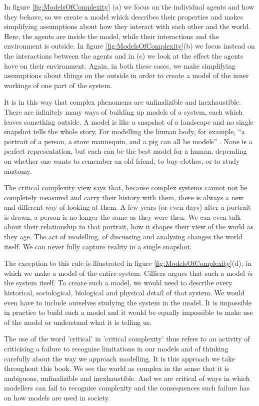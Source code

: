 In figure \ref{fig:ModelsOfComplexity} (a) we focus on the individual agents and how they behave, so we create a model which describes their properties and makes simplifying assumptions about how they interact with each other and the world. Here, the agents are inside the model, while their interactions and the environment is outside. In figure \ref{fig:ModelsOfComplexity}(b) we focus instead on the interactions between the agents and in (c) we look at the effect the agents have on their environment. Again, in both these cases, we make simplifying assumptions about things on the outside in order to create a model of the inner workings of one part of the system. 

It is in this way that complex phenomena are unfinalizible and inexhaustible. There are infinitely many ways of building up models of a system, each which leaves something outside. A model is like a snapshot of a landscape and no single snapshot tells the whole story. For modelling the human body, for example, ``a portrait of a person, a store mannequin, and a pig can all be models” \cite{blanchard2011differential}. None is a perfect representation, but each can be the best model for a human, depending on whether one wants to remember an old friend, to buy clothes, or to study anatomy. 

The critical complexity view says that, because complex systems cannot not be completely measured and carry their history with them, there is always a new and different way of looking at them. A few years (or even days) after a portrait is drawn, a person is no longer the same as they were then. We can even talk about their relationship to that portrait, how it shapes their view of the world as they age. The act of modelling, of discussing and analysing changes the world itself. We can never fully capture reality in a single snapshot.

The exception to this rule is illustrated in figure \ref{fig:ModelsOfComplexity}(d), in which we make a model of the entire system. Cilliers argues that such a model {\it is} the system itself. To create such a model, we would need to describe every historical, sociological, biological and physical detail of that system. We would even have to include ourselves studying the system in the model. It is impossible in practice to build such a model and it would be equally impossible to make use of the model or understand what it is telling us.

The use of the word 'critical' in 'critical complexity' thus refers to an activity of criticising a failure to recognise limitations in our models and of thinking carefully about the way we approach modelling. It is this approach we take throughout this book. We see the world as complex in the sense that it is  ambiguous, unfinalizible and inexhaustible. And we are critical of ways in which modellers can fail to recognise complexity and the consequences such failure has on how models are used in society. 

